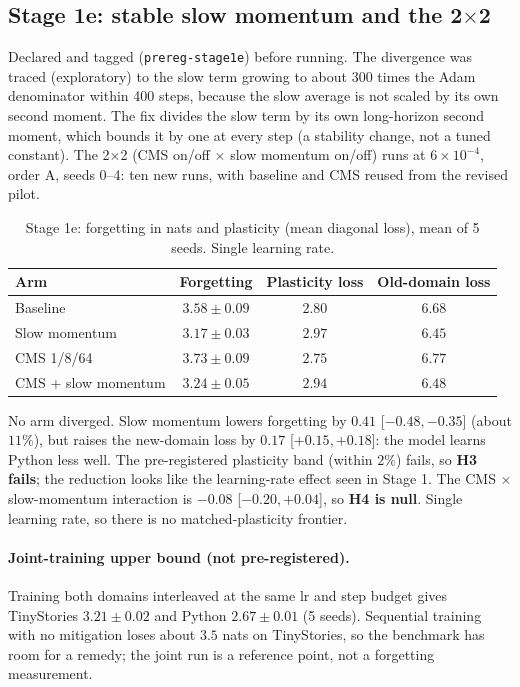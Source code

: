 \documentclass[10pt]{article}
\begin{document}
\subsection{Stage 1e: stable slow momentum and the 2$\times$2}\label{sec:s1e}
Declared and tagged (\texttt{prereg-stage1e}) before running. The divergence was traced (exploratory) to the slow term growing to about 300 times the Adam denominator within 400 steps, because the slow average is not scaled by its own second moment. The fix divides the slow term by its own long-horizon second moment, which bounds it by one at every step (a stability change, not a tuned constant). The 2$\times$2 (CMS on/off $\times$ slow momentum on/off) runs at $6\times10^{-4}$, order A, seeds 0--4: ten new runs, with baseline and CMS reused from the revised pilot.
\begin{table}[h]\centering\small
\begin{tabular}{lccc}\toprule
Arm & Forgetting & Plasticity loss & Old-domain loss\\ \midrule
Baseline & $3.58\pm0.09$ & $2.80$ & $6.68$\\
Slow momentum & $3.17\pm0.03$ & $2.97$ & $6.45$\\
CMS 1/8/64 & $3.73\pm0.09$ & $2.75$ & $6.77$\\
CMS + slow momentum & $3.24\pm0.05$ & $2.94$ & $6.48$\\ \bottomrule
\end{tabular}
\caption{Stage 1e: forgetting in nats and plasticity (mean diagonal loss), mean of 5 seeds. Single learning rate.}
\end{table}
No arm diverged. Slow momentum lowers forgetting by $0.41$ [$-0.48,-0.35$] (about $11\%$), but raises the new-domain loss by $0.17$ [$+0.15,+0.18$]: the model learns Python less well. The pre-registered plasticity band (within $2\%$) fails, so \textbf{H3 fails}; the reduction looks like the learning-rate effect seen in Stage 1. The CMS $\times$ slow-momentum interaction is $-0.08$ [$-0.20,+0.04$], so \textbf{H4 is null}. Single learning rate, so there is no matched-plasticity frontier.

\paragraph{Joint-training upper bound (not pre-registered).} Training both domains interleaved at the same lr and step budget gives TinyStories $3.21\pm0.02$ and Python $2.67\pm0.01$ (5 seeds). Sequential training with no mitigation loses about $3.5$ nats on TinyStories, so the benchmark has room for a remedy; the joint run is a reference point, not a forgetting measurement.
\end{document}
